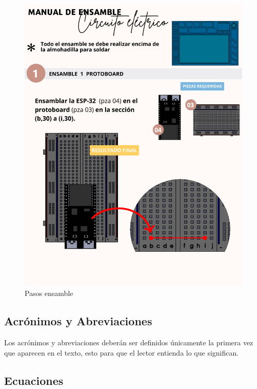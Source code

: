    \begin{figure}[H]
        \centering
        \includegraphics[trim = {1mm 1mm 1mm 1mm},clip,scale=0.2]{34/img/pasosEnsamble.png}
        \caption{Pasos ensamble}
        \label{fig:enter-label3}
    \end{figure}
    \subsection{Acrónimos y Abreviaciones}
    
    Los acrónimos y abreviaciones deberán ser definidos únicamente la primera vez que aparecen en el texto, esto para que el lector entienda lo que significan.
    
    \subsection{Ecuaciones}
    
